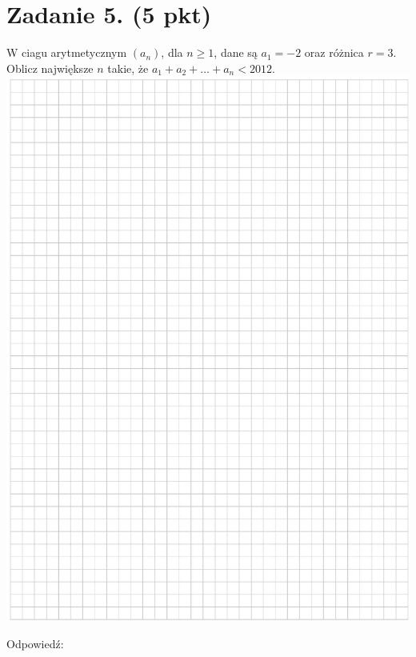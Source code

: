 \documentclass[10pt]{article}
\begin{document}
\section*{Zadanie 5. (5 pkt)}
W ciagu arytmetycznym \(\left(a_{n}\right)\), dla \(n \geq 1\), dane są \(a_{1}=-2\) oraz różnica \(r=3\). Oblicz największe \(n\) takie, że \(a_{1}+a_{2}+\ldots+a_{n}<2012\).\\
\includegraphics[max width=\textwidth, center]{2024_11_21_d9af6ed2d610d3f2d2cbg-08}

Odpowiedź:
\end{document}
